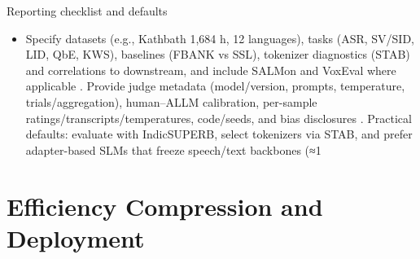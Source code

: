 \documentclass{article}
\begin{document}
Reporting checklist and defaults
\begin{itemize}
  \item Specify datasets (e.g., Kathbath 1,684 h, 12 languages), tasks (ASR, SV/SID, LID, QbE, KWS), baselines (FBANK vs SSL), tokenizer diagnostics (STAB) and correlations to downstream, and include SALMon and VoxEval where applicable \cite{entry2025indicsuperbspeechprocessinguniversalperf,vashishth2024stabspeechtokenizerassessmentbenchmark,maimon2025salmonsuiteacousticlanguagemodelevaluati,cui2025voxevalbenchmarkingknowledgeunderstandin}. Provide judge metadata (model/version, prompts, temperature, trials/aggregation), human–ALLM calibration, per-sample ratings/transcripts/temperatures, code/seeds, and bias disclosures \cite{wang2025bossbeyondsemanticspeech}. Practical defaults: evaluate with IndicSUPERB, select tokenizers via STAB, and prefer adapter-based SLMs that freeze speech/text backbones (≈1%
\end{itemize}

















\section{Efficiency Compression and Deployment} \label{sec:Efficiency Compression and Deployment}
\end{document}
